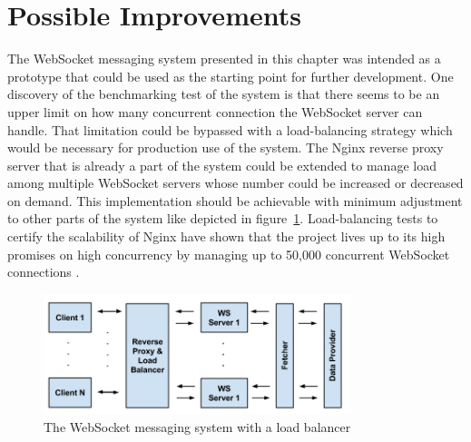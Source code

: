 \section{Possible Improvements}

The WebSocket messaging system presented in this chapter was intended as a prototype that could be used as the starting point for further development. One discovery of the benchmarking test of the system is that there seems to be an upper limit on how many concurrent connection the WebSocket server can handle. That limitation could be bypassed with a load-balancing strategy which would be necessary for production use of the system. The Nginx reverse proxy server that is already a part of the system could be extended to manage load among multiple WebSocket servers whose number could be increased or decreased on demand. This implementation should be achievable with minimum adjustment to other parts of the system like depicted in figure~\ref{fig:websocketMessagingSystemLoadBalancer}. Load-balancing tests to certify the scalability of Nginx have shown that the project lives up to its high promises on high concurrency by managing up to 50,000 concurrent WebSocket connections \cite{nginxWebsocket}.
\\
\begin{figure}[h!]
	\centering
	\includegraphics[width=0.8\textwidth]{images/websocketMessagingSystemLoadBalancer}
	\caption{The WebSocket messaging system with a load balancer}
	\label{fig:websocketMessagingSystemLoadBalancer}
\end{figure}

